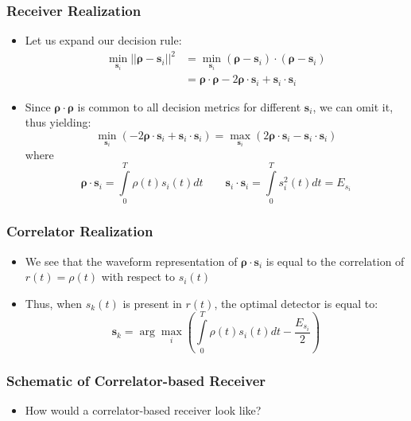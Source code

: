 \documentclass[10pt]{beamer}
\begin{document}
\frame
{
  \frametitle{Receiver Realization}

  \begin{itemize}
    \item Let us expand our decision rule:
    \begin{equation}
    \begin{split}
        \min\limits_{\mathbf{s}_i}||\mathbf{\rho}-\mathbf{s}_i||^2&=\min\limits_{\mathbf{s}_i}(\mathbf{\rho}-\mathbf{s}_i)\cdot(\mathbf{\rho}-\mathbf{s}_i)\\
        &=\mathbf{\rho}\cdot\mathbf{\rho}-2\mathbf{\rho}\cdot\mathbf{s}_i+\mathbf{s}_i\cdot\mathbf{s}_i\nonumber
    \end{split}
    \end{equation}
    \item Since $\mathbf{\rho}\cdot\mathbf{\rho}$ is common to all decision metrics for different $\mathbf{s}_i$, we can omit it, thus yielding:
    \begin{equation}
        \min\limits_{\mathbf{s}_i}\left(-2\mathbf{\rho}\cdot\mathbf{s}_i+\mathbf{s}_i\cdot\mathbf{s}_i\right)=\max\limits_{\mathbf{s}_i}\left(2\mathbf{\rho}\cdot\mathbf{s}_i-\mathbf{s}_i\cdot\mathbf{s}_i\right)\nonumber
    \end{equation}
    where
    \begin{equation}
        \mathbf{\rho}\cdot\mathbf{s}_i=\int\limits_{0}^{T}\rho(t)s_i(t)dt\qquad\mathbf{s}_i\cdot\mathbf{s}_i=\int\limits_{0}^{T}s_i^2(t)dt=E_{s_i}\nonumber
    \end{equation}
  \end{itemize}

}

\frame
{
  \frametitle{Correlator Realization}

  \begin{itemize}
    \item We see that the waveform representation of $\mathbf{\rho}\cdot\mathbf{s}_i$ is equal to the correlation of $r(t)=\rho(t)$ with respect to $s_i(t)$
    \item Thus, when $s_k(t)$ is present in $r(t)$, the optimal detector is equal to:
        \begin{equation}
            \mathbf{s}_k=\arg\max\limits_{i}\left(\int\limits_{0}^{T}\rho(t)s_i(t)dt-\frac{E_{s_i}}{2}\right)\nonumber
        \end{equation}
  \end{itemize}

}

\frame
{
  \frametitle{Schematic of Correlator-based Receiver}

  \begin{itemize}
   \item How would a correlator-based receiver look like?
  \end{itemize}


}
\end{document}
